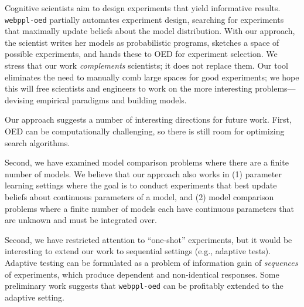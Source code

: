 \documentclass[10pt,letterpaper]{article}
\begin{document}
Cognitive scientists aim to design experiments that yield informative results.
\texttt{webppl-oed} partially automates experiment design, searching for experiments that maximally update beliefs about the model distribution.
With our approach, the scientist writes her models as probabilistic programs, sketches a space of possible experiments, and hands these to OED for experiment selection.
We stress that our work \emph{complements} scientists; it does not replace them.
Our tool eliminates the need to manually comb large spaces for good experiments; we hope this will free scientists and engineers to work on the more interesting problems---devising empirical paradigms and building models.

Our approach suggests a number of interesting directions for future work.
First, OED can be computationally challenging, so there is still room for optimizing search algorithms.

Second, we have examined model comparison problems where there are a finite number of models.
We believe that our approach also works in (1) parameter learning settings where the goal is to conduct experiments that best update beliefs about continuous parameters of a model, and (2) model comparison problems where a finite number of models each have continuous parameters that are unknown and must be integrated over.

Second, we have restricted attention to ``one-shot'' experiments, but it would be interesting to extend our work to sequential settings (e.g., adaptive tests).
Adaptive testing can be formulated as a problem of information gain of \emph{sequences} of experiments, which produce dependent and non-identical responses.
Some preliminary work suggests that \texttt{webppl-oed} can be profitably extended to the adaptive setting.


%

% 


\end{document}
